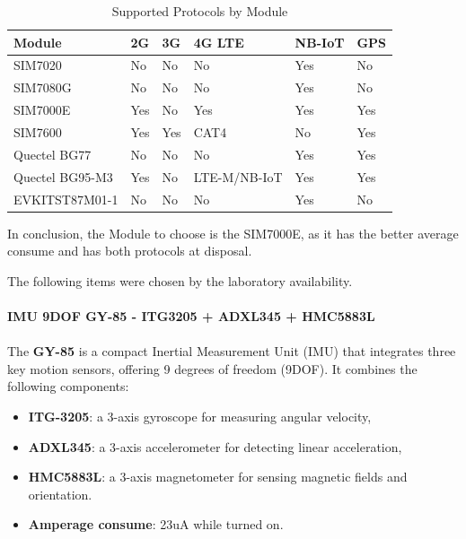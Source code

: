 \begin{table}[h!]
    \centering
    \begin{tabular}{l|l|l|l|l|l}
    \textbf{Module} & \textbf{2G} & \textbf{3G} & \textbf{4G LTE} & \textbf{NB-IoT} & \textbf{GPS} \\
    \hline
    SIM7020         & No          & No          & No             & Yes             & No  \\
    SIM7080G        & No          & No          & No             & Yes             & No  \\
    SIM7000E        & Yes         & No          & Yes            & Yes             & Yes \\
    SIM7600         & Yes         & Yes         & CAT4           & No              & Yes \\
    Quectel BG77    & No          & No          & No             & Yes             & Yes \\
    Quectel BG95-M3 & Yes         & No          & LTE-M/NB-IoT   & Yes             & Yes \\
    EVKITST87M01-1  & No          & No          & No             & Yes             & No  \\
    \end{tabular}
    \caption{Supported Protocols by Module}
    \label{table:Supported Protocols by Module}
\end{table}
 
In conclusion, the Module to choose is the SIM7000E, as it has the better 
average consume and has both protocols at disposal.

The following items were chosen by the laboratory availability.
\\\\
\textbf{IMU 9DOF GY-85 - ITG3205 + ADXL345 + HMC5883L}
\\\\
The \textbf{GY-85} is a compact Inertial Measurement Unit (IMU) that integrates three key motion sensors, offering 9 degrees of freedom (9DOF). It combines the following components:

\begin{itemize}
    \item \textbf{ITG-3205}: a 3-axis gyroscope for measuring angular velocity,
    \item \textbf{ADXL345}: a 3-axis accelerometer for detecting linear acceleration,
    \item \textbf{HMC5883L}: a 3-axis magnetometer for sensing magnetic fields and orientation.
    \item \textbf{Amperage consume}: 23uA while turned on.
\end{itemize}


